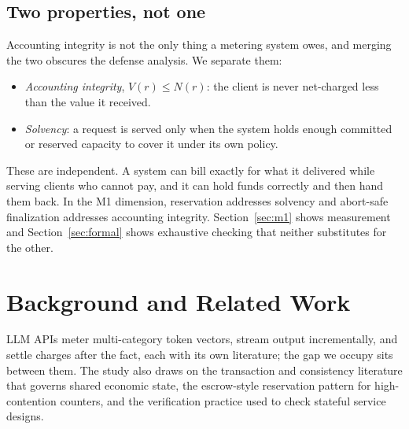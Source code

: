 \documentclass[manuscript,review,anonymous]{acmart}
\begin{document}
\subsection{Two properties, not one}
Accounting integrity is not the only thing a metering system owes, and merging the two
obscures the defense analysis. We separate them:
\begin{itemize}
\item \textit{Accounting integrity}, $V(r) \le N(r)$: the client is never net-charged
less than the value it received.
\item \textit{Solvency}: a request is served only when the system holds enough committed
or reserved capacity to cover it under its own policy.
\end{itemize}
These are independent. A system can bill exactly for what it delivered while serving
clients who cannot pay, and it can hold funds correctly and then hand them back. In the
M1 dimension, reservation addresses solvency and abort-safe finalization addresses
accounting integrity. Section~\ref{sec:m1} shows measurement and Section~\ref{sec:formal}
shows exhaustive checking that neither substitutes for the other.

\section{Background and Related Work}
\label{sec:related}
LLM APIs meter multi-category token vectors, stream output incrementally, and settle
charges after the fact, each with its own literature; the gap we occupy sits between
them. The study also draws on the transaction and consistency literature that governs
shared economic state, the escrow-style reservation pattern for high-contention counters,
and the verification practice used to check stateful service designs.
\end{document}
